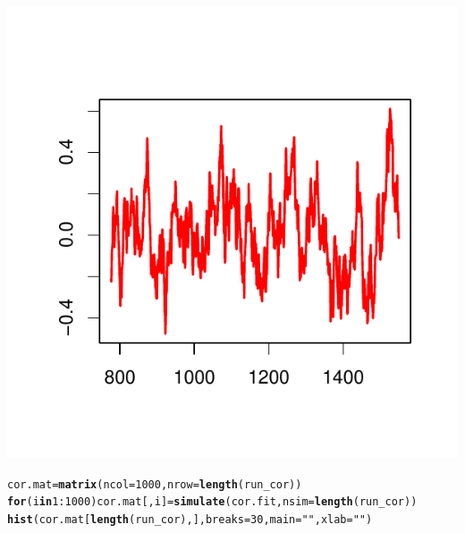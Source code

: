\documentclass[10pt]{article}\usepackage[]{graphicx}\usepackage[]{color}
\makeatletter
\def\maxwidth{ %
  \ifdim\Gin@nat@width>\linewidth
    \linewidth
  \else
    \Gin@nat@width
  \fi
}
\newcommand{\hlnum}[1]{\textcolor[rgb]{0.686,0.059,0.569}{#1}}%
\newcommand{\hlstr}[1]{\textcolor[rgb]{0.192,0.494,0.8}{#1}}%
\newcommand{\hlopt}[1]{\textcolor[rgb]{0,0,0}{#1}}%
\newcommand{\hlstd}[1]{\textcolor[rgb]{0.345,0.345,0.345}{#1}}%
\newcommand{\hlkwa}[1]{\textcolor[rgb]{0.161,0.373,0.58}{\textbf{#1}}}%
\newcommand{\hlkwb}[1]{\textcolor[rgb]{0.69,0.353,0.396}{#1}}%
\newcommand{\hlkwc}[1]{\textcolor[rgb]{0.333,0.667,0.333}{#1}}%
\newcommand{\hlkwd}[1]{\textcolor[rgb]{0.737,0.353,0.396}{\textbf{#1}}}%
\newenvironment{kframe}{%
 \def\at@end@of@kframe{}%
 \ifinner\ifhmode%
  \def\at@end@of@kframe{\end{minipage}}%
  \begin{minipage}{\columnwidth}%
 \fi\fi%
 \def\FrameCommand##1{\hskip\@totalleftmargin \hskip-\fboxsep
 \colorbox{shadecolor}{##1}\hskip-\fboxsep
     \hskip-\linewidth \hskip-\@totalleftmargin \hskip\columnwidth}%
 \MakeFramed {\advance\hsize-\width
   \@totalleftmargin\z@ \linewidth\hsize
   \@setminipage}}%
 {\par\unskip\endMakeFramed%
 \at@end@of@kframe}
\newenvironment{knitrout}{}{} %
\makeatother
\begin{document}
\begin{knitrout}
{\centering \includegraphics[width=\maxwidth]{figure/unnamed-chunk-202} 

}


\begin{kframe}\begin{alltt}
\hlstd{cor.mat} \hlkwb{=} \hlkwd{matrix}\hlstd{(}\hlkwc{ncol} \hlstd{=} \hlnum{1000}\hlstd{,} \hlkwc{nrow} \hlstd{=} \hlkwd{length}\hlstd{(run_cor))}
\hlkwa{for} \hlstd{(i} \hlkwa{in} \hlnum{1}\hlopt{:}\hlnum{1000}\hlstd{) cor.mat[, i]} \hlkwb{=} \hlkwd{simulate}\hlstd{(cor.fit,} \hlkwc{nsim} \hlstd{=} \hlkwd{length}\hlstd{(run_cor))}
\hlkwd{hist}\hlstd{(cor.mat[}\hlkwd{length}\hlstd{(run_cor), ],} \hlkwc{breaks} \hlstd{=} \hlnum{30}\hlstd{,} \hlkwc{main} \hlstd{=} \hlstr{""}\hlstd{,} \hlkwc{xlab} \hlstd{=} \hlstr{""}\hlstd{)}
\end{alltt}
\end{kframe}


\end{knitrout}
\end{document}
